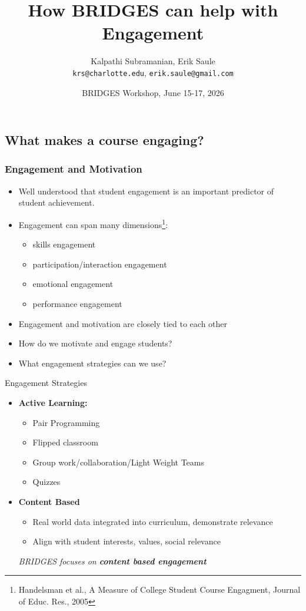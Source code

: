 \documentclass[aspectratio=169]{beamer}
\title{How BRIDGES can help with Engagement}
\subtitle{}
\author{Kalpathi Subramanian, Erik Saule\\\texttt{krs@charlotte.edu}, \texttt{erik.saule@gmail.com}}
\institute{The University of North Carolina at Charlotte}
\date{BRIDGES Workshop, June 15-17, 2026}
\begin{document}
\begin{frame}
\titlepage
\end{frame}




\subsection{What makes a course engaging?}

\begin{frame}
	\frametitle{Engagement and Motivation}
\begin{itemize} 
	\item Well understood that student engagement is an important
		predictor of student achievement.
	\item Engagement can span many dimensions\footnote{Handelsman et al., 
	A Measure of College Student Course Engagment, Journal of Educ. Res., 2005}: 
		\begin{itemize}
			\item skills engagement
			\item participation/interaction engagement
			\item emotional engagement
			\item performance engagement
		\end{itemize}
	\item Engagement and motivation are closely tied to each other
	\item How do we motivate and engage students? 
	\item What engagement  strategies  can we use? 
\end{itemize}
\end{frame}
\begin{frame}{Engagement Strategies}
\begin{itemize}
	\item \textbf{Active Learning:}
	\begin{itemize}
		\item Pair Programming
		\item Flipped classroom
		\item Group work/collaboration/Light Weight Teams
		\item Quizzes
	\end{itemize}
	\item \textbf{Content Based}
	\begin{itemize}
		\item Real world data integrated into  curriculum, demonstrate
			relevance
		\item Align with student interests, values, social relevance
	\end{itemize}
\vspace*{0.2in}
\textsl{\large BRIDGES focuses on \textbf{content based engagement}}
\end{itemize}
\end{frame}
\end{document}
